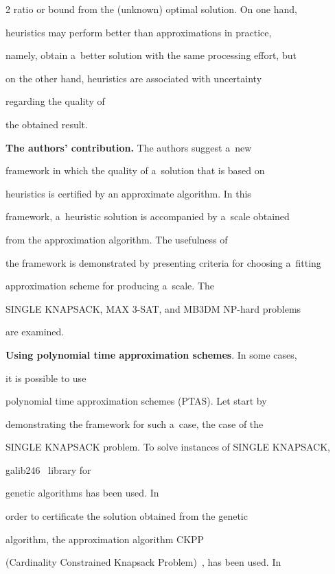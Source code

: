 \begin{multicols}{2}
ratio or bound from the (unknown) optimal solution. On one hand,


heuristics may perform better than approximations in practice,


namely, obtain a~better solution with the same processing effort, but


on the other hand, heuristics are associated with uncertainty


regarding the quality of


the obtained result.





\noindent


\textbf{The authors' contribution.} The authors suggest a~new


framework in which the quality of a~solution that is based on


heuristics is certified by an approximate algorithm. In this


framework, a~heuristic solution is accompanied by a~scale obtained


from the approximation algorithm. The usefulness of


the framework is demonstrated by presenting criteria for choosing a~fitting


approximation scheme for producing a~scale. The


{SINGLE KNAPSACK}, {MAX 3-SAT}, and {MB3DM} NP-hard problems


are examined.





\noindent


\textbf{Using polynomial time approximation schemes}. In some cases,


it is possible to use


polynomial time approximation schemes (PTAS). Let start by


demonstrating the framework for such a~case, the case of the


SINGLE KNAPSACK problem. To solve instances of SINGLE KNAPSACK,


galib246~\cite{GAlib} library for


genetic algorithms has been used. In


order to certificate the solution obtained from the genetic


algorithm, the approximation algorithm CKPP


(Cardinality Constrained Knapsack Problem)~\cite{KPP99}, has been used. In



\end{multicols}
